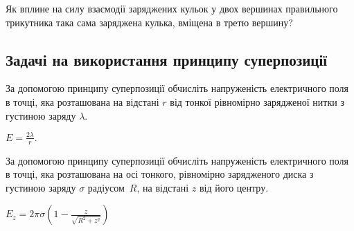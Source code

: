 \begin{problem}
    Як вплине на силу взаємодії заряджених кульок у двох вершинах правильного трикутника така сама заряджена кулька, вміщена в третю вершину?
\end{problem}

\subsection*{Задачі на використання принципу суперпозиції}

\begin{problem}\label{prb:thread}
За допомогою принципу суперпозиції обчисліть напруженість електричного поля в точці, яка розташована на відстані $r$ від тонкої рівномірно зарядженої нитки з густиною заряду $\lambda$.
\begin{solution}
	$E = \frac{2\lambda}{r}.$
\end{solution}
\end{problem}



\begin{problem}\label{prb:disk}
За допомогою принципу суперпозиції обчисліть напруженість електричного поля в точці, яка розташована на осі тонкого, рівномірно зарядженого диска з густиною заряду $\sigma$ радіусом~$R$, на відстані $z$ від його центру.
\begin{solution}
	$E_z = 2\pi\sigma \left( 1 - \frac{z}{\sqrt{R^2 + z^2}}\right)$
\end{solution}
\end{problem}

